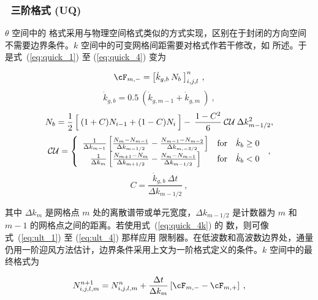 \vssub
\subsubsection{~三阶格式 (UQ)}

\noindent
$\theta$ 空间中的 \uq{} 格式采用与物理空间格式类似的方式实现，区别在于封闭的方向空间不需要边界条件。$k$ 空间中的可变网格间距需要对格式作若干修改，如 \cite[{Appendix}]{art:Leo79} 所述。于是式~(\ref{eq:quick_1}) 至
(\ref{eq:quick_4}) 变为


\begin{equation}
\cF_{m,-} = \left [ \dot{k}_{g,b} \: N_b \: \right ]^n_{i,j,l}
\: , \label{eq:quick_1k}\end{equation} \begin{equation}
\dot{k}_{g,b} = 0.5 \: \left ( \dot{k}_{g,m-1} + \dot{k}_{g,m} 
\: \right )  \: , \label{eq:quick_1ak}
\end{equation} \begin{equation}
N_b = \frac{1}{2} \left [ \rule[0mm]{0mm}{\baselineskip} \: 
(1+C)N_{i-1} + (1-C)N_i \: \right ] - \:
\frac{1-C^2}{6} \: {\cal CU} \: \Delta k^2_{m-1/2}, \label{eq:quick_2k} \end{equation} \begin{equation}
{\cal CU} =  \left \{ \begin{array}{ccc}
\frac{1}{\Delta k_{m-1}}
\left [ \frac{N_{ m }-N_{m-1}}{\Delta k_{m-1/2}} - 
        \frac{N_{m-1}-N_{m-2}}{\Delta k_{m,-3/2}} \right ]
               & \mbox{for} & \dot{k}_b \geq 0 \\
\frac{1}{\Delta k_m}
\left [ \frac{N_{m+1}-N_{ m }}{\Delta k_{m+1/2}} -
       \frac{N_{ m }-N_{m-1}}{\Delta k_{m-1/2}} \right ]
               & \mbox{for} & \dot{k}_b   <  0
\end{array} \right . \: , \label{eq:quick_3k}
\end{equation} \begin{equation}
C = \frac{\dot{k}_{g,b} \: \Delta t}{\Delta k_{m-1/2}}
\: , \label{eq:quick_4k} \end{equation}

\noindent
其中 $\Delta k_m$ 是网格点 $m$ 处的离散谱带或单元宽度，$\Delta k_{m-1/2}$ 是计数器为 $m$ 和 $m-1$ 的网格点之间的距离。若使用式~(\ref{eq:quick_4k}) 的 \cfl{} 数，则可像式~(\ref{eq:ult_1}) 至
(\ref{eq:ult_4}) 那样应用 \ult{} 限制器。在低波数和高波数边界处，通量仍用一阶迎风方法估计，边界条件采用上文为一阶格式定义的条件。$k$ 空间中的最终格式为


\begin{equation}
N_{i,j,l,m}^{n+1} = N_{i,j,l,m}^n 
 + \frac{\Delta t}{\Delta k_m} \left [ \cF_{m,-} - \cF_{m,+} \right ]
\: , \label{eq:uq_k_tot} \end{equation}

